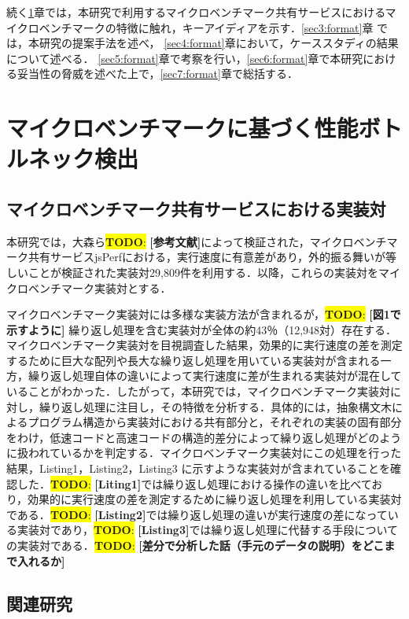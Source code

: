 \documentclass[submit,techrep,noauthor]{ipsj}
\newcommand{\todo}[1]{\colorbox{yellow}{{\bf TODO}:}{\color{red} {\textbf{[#1]}}}}
\begin{document}
続く\ref{sec2:format}章では，本研究で利用するマイクロベンチマーク共有サービスにおけるマイクロベンチマークの特徴に触れ，キーアイディアを示す．\ref{sec3:format}章 では，本研究の提案手法を述べ， \ref{sec4:format}章において，ケーススタディの結果について述べる． \ref{sec5:format}章で考察を行い，\ref{sec6:format}章で本研究における妥当性の脅威を述べた上で，\ref{sec7:format}章で総括する． 


\section{マイクロベンチマークに基づく性能ボトルネック検出}
\label{sec2:format}

\subsection{マイクロベンチマーク共有サービスにおける実装対}

本研究では，大森ら\todo{参考文献}によって検証された，マイクロベンチマーク共有サービスjsPerfにおける，実行速度に有意差があり，外的振る舞いが等しいことが検証された実装対29,809件を利用する．以降，これらの実装対をマイクロベンチマーク実装対とする．

マイクロベンチマーク実装対には多様な実装方法が含まれるが，\todo{図1で示すように} 繰り返し処理を含む実装対が全体の約43％（12,948対）存在する．マイクロベンチマーク実装対を目視調査した結果，効果的に実行速度の差を測定するために巨大な配列や長大な繰り返し処理を用いている実装対が含まれる一方，繰り返し処理自体の違いによって実行速度に差が生まれる実装対が混在していることがわかった．したがって，本研究では，マイクロベンチマーク実装対に対し，繰り返し処理に注目し，その特徴を分析する．具体的には，抽象構文木によるプログラム構造から実装対における共有部分と，それぞれの実装の固有部分をわけ，低速コードと高速コードの構造的差分によって繰り返し処理がどのように扱われているかを判定する．マイクロベンチマーク実装対にこの処理を行った結果，Listing1，Listing2，Listing3 に示すような実装対が含まれていることを確認した．\todo{Liting1}では繰り返し処理における操作の違いを比べており，効果的に実行速度の差を測定するために繰り返し処理を利用している実装対である．\todo{Listing2}では繰り返し処理の違いが実行速度の差になっている実装対であり，\todo{Listing3}では繰り返し処理に代替する手段についての実装対である．\todo{差分で分析した話（手元のデータの説明）をどこまで入れるか}


\subsection{関連研究}
\end{document}

